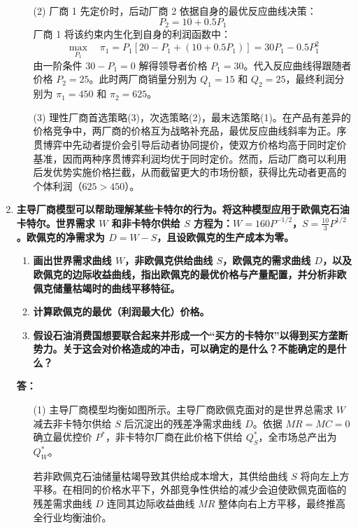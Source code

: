 \begin{enumerate}[label=\textbf{\arabic*.}, leftmargin=*]
\begin{enumerate}
			\item[(2)] 厂商 1 先定价时，后动厂商 2 依据自身的最优反应曲线决策：
			\[ P_2 = 10 + 0.5P_1 \]
			厂商 1 将该约束内生化到自身的利润函数中：
			\[ \max_{P_1} \quad \pi_1 = P_1\left[20 - P_1 + (10 + 0.5P_1)\right] = 30P_1 - 0.5P_1^2 \]
			由一阶条件 $30 - P_1 = 0$ 解得领导者价格 $P_1 = 30$。代入反应曲线得跟随者价格 $P_2 = 25$。此时两厂商销量分别为 $Q_1 = 15$ 和 $Q_2 = 25$，最终利润分别为 $\pi_1 = 450$ 和 $\pi_2 = 625$。
			
			\item[(3)] 理性厂商首选策略(3)，次选策略(2)，最末选策略(1)。在产品有差异的价格竞争中，两厂商的价格互为战略补充品，最优反应曲线斜率为正。序贯博弈中先动者提价会引导后动者协同提价，使双方价格均高于同时定价基准，因而两种序贯博弈利润均优于同时定价。然而，后动厂商可以利用后发优势实施价格拦截，从而截留更大的市场份额，获得比先动者更高的个体利润（$625 > 450$）。
		\end{enumerate}
		\newpage
		\item \textbf{主导厂商模型可以帮助理解某些卡特尔的行为。将这种模型应用于欧佩克石油卡特尔。世界需求 $W$ 和非卡特尔供给 $S$ 方程为：$W = 160P^{-1/2}$，$S = \frac{10}{3}P^{1/2}$。欧佩克的净需求为 $D = W - S$，且设欧佩克的生产成本为零。}
		
		\begin{enumerate}
			\item \textbf{画出世界需求曲线 $W$，非欧佩克供给曲线 $S$，欧佩克的需求曲线 $D$，以及欧佩克的边际收益曲线，指出欧佩克的最优价格与产量配置，并分析非欧佩克储量枯竭时的曲线平移特征。}
			\item \textbf{计算欧佩克的最优（利润最大化）价格。}
			\item \textbf{假设石油消费国想要联合起来并形成一个“买方的卡特尔”以得到买方垄断势力。关于这会对价格造成的冲击，可以确定的是什么？不能确定的是什么？}
		\end{enumerate}
		
		\textbf{答：}
		\begin{enumerate}
			\item[(1)] 主导厂商模型均衡如图所示。主导厂商欧佩克面对的是世界总需求 $W$ 减去非卡特尔供给 $S$ 后沉淀出的残差净需求曲线 $D$。依据 $MR = MC = 0$ 确立最优控价 $P^*$，非卡特尔厂商在此价格下供给 $Q_S^*$，全市场总产出为 $Q_W^*$。
			
			若非欧佩克石油储量枯竭导致其供给成本增大，其供给曲线 $S$ 将向左上方平移。在相同的价格水平下，外部竞争性供给的减少会迫使欧佩克面临的残差需求曲线 $D$ 连同其边际收益曲线 $MR$ 整体向右上方平移，最终推高全行业均衡油价。
			

\end{enumerate}
\end{enumerate}
